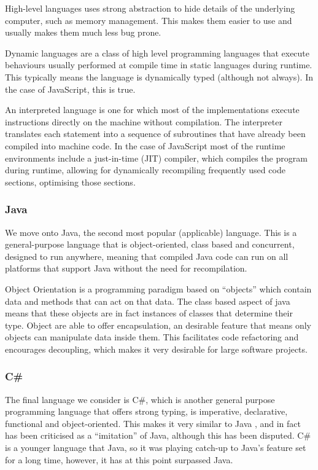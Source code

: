 \documentclass[11pt, a4paper, twocolumn, twoside]{report}
\begin{document}
High-level languages uses strong abstraction to hide details of the underlying computer, such as memory management. This makes them easier to use and usually makes them much less bug prone.

Dynamic languages are a class of high level programming languages that execute behaviours usually performed at compile time in static languages during runtime. \citep{trattdyamicallytypedlanguages} This typically means the language is dynamically typed (although not always). In the case of JavaScript, this is true.

An interpreted language is one for which most of the implementations execute instructions directly on the machine without compilation. The interpreter translates each statement into a sequence of subroutines that have already been compiled into machine code. In the case of JavaScript most of the runtime environments include a just-in-time (JIT) compiler, which compiles the program during runtime, allowing for dynamically recompiling frequently used code sections, optimising those sections. \citep{aycock2003brief}

\subsubsection{Java}

We move onto Java, the second most popular (applicable) language. This is a general-purpose language that is object-oriented, class based and concurrent, \citep{gosling2014java} designed to run anywhere, meaning that compiled Java code can run on all platforms that support Java without the need for recompilation. \citep{gosling1995java}

Object Orientation is a programming paradigm based on ``objects'' which contain data and methods that can act on that data. The class based aspect of java means that these objects are in fact instances of classes that determine their type. \citep{kindler2011object} Object are able to offer encapsulation, an desirable feature that means only objects can manipulate data inside them. This facilitates code refactoring and encourages decoupling, which makes it very desirable for large software projects.

\subsubsection{C\#}

The final language we consider is C\#, which is another general purpose programming language that offers strong typing, is imperative, declarative, functional and object-oriented. This makes it very similar to Java \citep{kreft2017afterjava}, and in fact has been criticised as a ``imitation'' of Java, although this has been disputed. C\# is a younger language that Java, so it was playing catch-up to Java's feature set for a long time, however, it has at this point surpassed Java.
\end{document}
